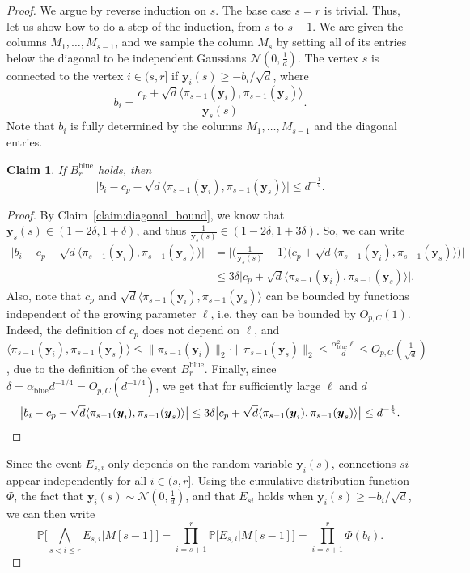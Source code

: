 \documentclass[11pt]{amsart}
\newtheorem{claim}[theorem]{\bf Claim}
\theoremstyle{definition}
\def\cN{\mathcal{N}}
\def\Pb{\mathbb{P}}
\def\by{\boldsymbol{y}}
\DeclareMathOperator{\blue}{blue}
\begin{document}
\begin{proof}
We argue by reverse induction on $s$. The base case $s=r$ is trivial. Thus, let us show how to do a step of the induction, from $s$ to $s-1$. We are given the columns $M_1, \dots, M_{s-1}$, and we sample the column $M_s$ by setting all of its entries below the diagonal to be independent Gaussians $\cN(0, \frac{1}{d})$. The vertex $s$ is connected to the vertex $i\in (s, r]$ if $\by_i(s)\geq -b_i/\sqrt{d}$, where 
{\smaller[0.3]
\[b_i=\frac{c_p+\sqrt{d}\langle \pi_{s-1}(\by_i), \pi_{s-1}(\by_s)\rangle}{\by_s(s)}.\]
}
Note that $b_i$ is fully determined by the columns $M_1, \dots, M_{s-1}$ and the diagonal entries. \begin{claim}\label{claim:b_i inequality}
If $B^{\blue}_r$ holds, then
{\smaller[0.3]
\[\big|b_i-c_p-\sqrt{d}\langle \pi_{s-1}(\by_i), \pi_{s-1}(\by_s)\rangle\big|\leq d^{-\frac{1}{5}}.\]
}
\end{claim}
\begin{proof}
By Claim~\ref{claim:diagonal_bound}, we know that $\by_s(s)\in (1-2\delta, 1+\delta)$, and thus $\frac{1}{\by_s(s)}\in (1-2\delta, 1+3\delta)$. So, we can write
{\smaller[0.3]
\begin{align*}
\big|b_i-c_p-\sqrt{d}\langle \pi_{s-1}(\by_i), \pi_{s-1}(\by_s)\rangle\big|&=\big|\big(\frac{1}{\by_s(s)}-1\big)\big(c_p+\sqrt{d}\langle \pi_{s-1}(\by_i), \pi_{s-1}(\by_s)\rangle\big)\big|\\
&\leq 3\delta\big|c_p+\sqrt{d}\langle \pi_{s-1}(\by_i), \pi_{s-1}(\by_s)\rangle\big|.
\end{align*}
}
Also, note that $c_p$ and $\sqrt{d}\langle \pi_{s-1}(\by_i), \pi_{s-1}(\by_s)\rangle$ can be bounded by functions independent of the growing parameter $\ell$, i.e. they can be bounded by $O_{p, C}(1)$. Indeed, the definition of $c_p$ does not depend on $\ell$, and $\langle \pi_{s-1}(\by_i), \pi_{s-1}(\by_s)\rangle\leq \|\pi_{s-1}(\by_i)\|_2\cdot  \|\pi_{s-1}(\by_s)\|_2\leq \frac{\alpha_{\blue}^2\ell}{d}\leq O_{p, C}(\frac{1}{\sqrt{d}})$, due to the definition of the event $B^{\blue}_r$. Finally, since $\delta=\alpha_{\blue} d^{-1/4}=O_{p, C}(d^{-1/4})$, we get that for sufficiently large $\ell$ and $d$
{\smaller[0.3]
\[
\big|b_i-c_p-\sqrt{d}\langle \pi_{s-1}(\by_i), \pi_{s-1}(\by_s)\rangle\big|\leq 3\delta\big|c_p+\sqrt{d}\langle \pi_{s-1}(\by_i), \pi_{s-1}(\by_s)\rangle\big|\leq d^{-\frac{1}{5}}.\qedhere
\]
}
\end{proof}

Since the event $E_{s,i}$ only depends on the random variable $\by_i(s)$, connections $si$ appear independently for all $i\in (s, r]$. Using the cumulative distribution function $\Phi$, the fact that $\by_i(s)\sim \cN(0, \frac{1}{d})$, and that $E_{si}$ holds when $\by_i(s)\geq -b_i/\sqrt{d}$, we can then write
{\smaller[0.3]
\begin{equation}
  \Pb\bigg[\bigwedge_{s<i\leq r}E_{s, i}\bigg|M[s\!-\!1]\bigg]=\prod_{i=s+1}^r \Pb\big[E_{s, i}\big|M[s\!-\!1]\big]=\prod_{i=s+1}^r\Phi(b_i).  
\end{equation}
}


\end{proof}
\end{document}
